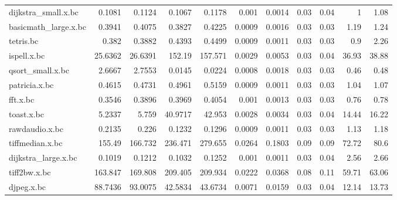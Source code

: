 \begin{tabular}{lrrrrrrrrrr}
 dijkstra\_small.x.bc  &          0.1081 &          0.1124 &   0.1067 &   0.1178 &   0.001  &   0.0014 &           0.03 &           0.04 &           1    &           1.08 \\
 basicmath\_large.x.bc &          0.3941 &          0.4075 &   0.3827 &   0.4225 &   0.0009 &   0.0016 &           0.03 &           0.03 &           1.19 &           1.24 \\
 tetris.bc            &          0.382  &          0.3882 &   0.4393 &   0.4499 &   0.0009 &   0.0011 &           0.03 &           0.03 &           0.9  &           2.26 \\
 ispell.x.bc          &         25.6362 &         26.6391 & 152.19   & 157.571  &   0.0029 &   0.0053 &           0.03 &           0.04 &          36.93 &          38.88 \\
 qsort\_small.x.bc     &          2.6667 &          2.7553 &   0.0145 &   0.0224 &   0.0008 &   0.0018 &           0.03 &           0.03 &           0.46 &           0.48 \\
 patricia.x.bc        &          0.4615 &          0.4731 &   0.4961 &   0.5159 &   0.0009 &   0.0011 &           0.03 &           0.03 &           1.04 &           1.07 \\
 fft.x.bc             &          0.3546 &          0.3896 &   0.3969 &   0.4054 &   0.001  &   0.0013 &           0.03 &           0.03 &           0.76 &           0.78 \\
 toast.x.bc           &          5.2337 &          5.759  &  40.9717 &  42.953  &   0.0028 &   0.0034 &           0.03 &           0.04 &          14.44 &          16.22 \\
 rawdaudio.x.bc       &          0.2135 &          0.226  &   0.1232 &   0.1296 &   0.0009 &   0.0011 &           0.03 &           0.03 &           1.13 &           1.18 \\
 tiffmedian.x.bc      &        155.49   &        166.732  & 236.471  & 279.655  &   0.0264 &   0.1803 &           0.09 &           0.09 &          72.72 &          80.6  \\
 dijkstra\_large.x.bc  &          0.1019 &          0.1212 &   0.1032 &   0.1252 &   0.001  &   0.0011 &           0.03 &           0.04 &           2.56 &           2.66 \\
 tiff2bw.x.bc         &        163.847  &        169.808  & 209.405  & 209.934  &   0.0222 &   0.0368 &           0.08 &           0.11 &          59.71 &          63.06 \\
 djpeg.x.bc           &         88.7436 &         93.0075 &  42.5834 &  43.6734 &   0.0071 &   0.0159 &           0.03 &           0.04 &          12.14 &          13.73 \\

\end{tabular}
